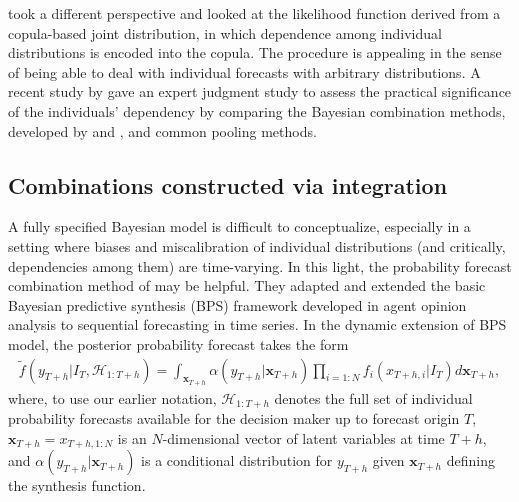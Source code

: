 \documentclass[11pt]{article}
\begin{document}
\citet{Jouini1996-fe} took a different perspective and looked at the likelihood function derived from a copula-based joint distribution, in which dependence among individual distributions is encoded into the copula. The procedure is appealing in the sense of being able to deal with individual forecasts with arbitrary distributions. A recent study by \citet{Wilson2017-ct} gave an expert judgment study to assess the practical significance of the individuals' dependency by comparing the Bayesian combination methods, developed by \citet{Winkler1981-bn} and \citet{Jouini1996-fe}, and common pooling methods.

\subsection{Combinations constructed via integration}

A fully specified Bayesian model is difficult to conceptualize, especially in a setting where biases and miscalibration of individual distributions (and critically, dependencies among them) are time-varying. In this light, the probability forecast combination method of \citet{McAlinn2019-kn} may be helpful. They adapted and extended the basic Bayesian predictive synthesis (BPS) framework developed in agent opinion analysis \citep[see, e.g.,][]{Genest1985-bu,West1992-qy,West1992-gr} to sequential forecasting in time series. In the dynamic extension of BPS model, the posterior probability forecast takes the form
\begin{align*}
  \tilde{f}\left(y_{T+h} | I_{T}, \mathcal{H}_{1: T+h}\right) = \int_{\bm{x}_{T+h}} \alpha\left(y_{T+h} | \bm{x}_{T+h}\right) \prod_{i=1: N} f_{i}\left(x_{T+h,i}|I_{T}\right) d \bm{x}_{T+h},
\end{align*}
where, to use our earlier notation, $\mathcal{H}_{1: T+h}$ denotes the full set of individual probability forecasts available for the decision maker up to forecast origin $T$, $\bm{x}_{T+h} = x_{T+h, 1:N}$ is an $N$-dimensional vector of latent variables at time $T+h$, and $\alpha\left(y_{T+h} | \bm{x}_{T+h}\right)$ is a conditional distribution for $y_{T+h}$ given $\bm{x}_{T+h}$ defining the synthesis function.
\end{document}
